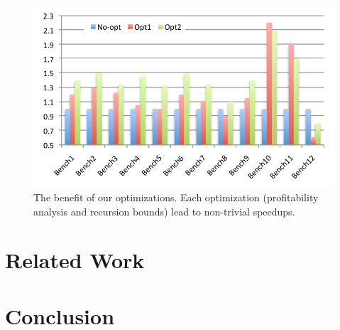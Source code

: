 \documentclass[sigplan,10pt,review,anonymous]{acmart}
\begin{document}
\begin{figure}[t!]
\begin{center}
\includegraphics[width=0.9\columnwidth]{images/Opt_Speedups}
\caption{The benefit of our optimizations.
Each optimization (profitability analysis and recursion bounds) lead to
non-trivial speedups.}
\label{fig:Opt_Speedups}
\end{center}
\end{figure}


\section{Related Work}
\label{sec:rw}


\section{Conclusion}
\label{sec:conc}


\end{document}
